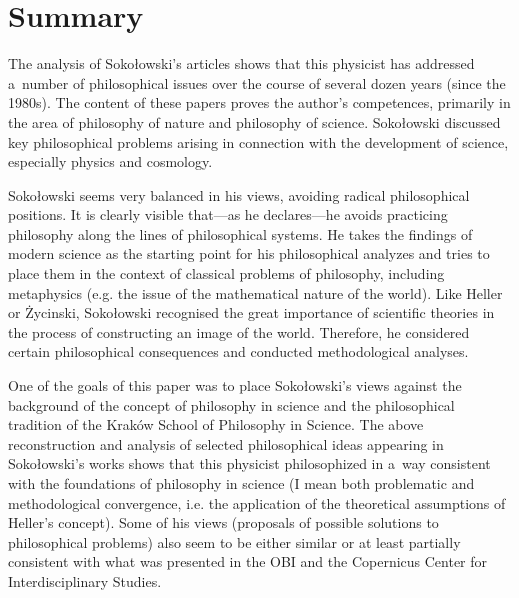 \documentclass[%
  manuscript=article,
  year=2024,
  volume=77,
  doi=10.59203/zfn.77.689,
]{zfn}
\begin{document}
\section{Summary}

The analysis of Sokołowski's articles shows that this physicist has addressed a~number of philosophical issues over the course of several dozen years (since the 1980s). The content of these papers proves the author's competences, primarily in the area of philosophy of nature and philosophy of science. Sokołowski discussed key philosophical problems arising in connection with the development of science, especially physics and cosmology.



Sokołowski seems very balanced in his views, avoiding radical philosophical positions. It is clearly visible that---as he declares---he avoids practicing philosophy along the lines of philosophical systems. He takes the findings of modern science as the starting point for his philosophical analyzes and tries to place them in the context of classical problems of philosophy, including metaphysics (e.g. the issue of the mathematical nature of the world). Like Heller or Życinski, Sokołowski recognised the great importance of scientific theories in the process of constructing an image of the world. Therefore, he considered certain philosophical consequences and conducted methodological analyses.



One of the goals of this paper was to place Sokołowski's views against the background of the concept of philosophy in science and the philosophical tradition of the Kraków School of Philosophy in Science. The above reconstruction and analysis of selected philosophical ideas appearing in Sokołowski's works shows that this physicist philosophized in a~way consistent with the foundations of philosophy in science (I mean both problematic and methodological convergence, i.e. the application of the theoretical assumptions of Heller's concept). Some of his views (proposals of possible solutions to philosophical problems) also seem to be either similar or at least partially consistent with what was presented in the OBI and the Copernicus Center for Interdisciplinary Studies.
\end{document}
